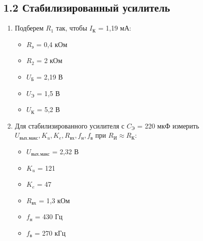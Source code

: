 \documentclass[a4paper,12pt]{report}
\begin{document}
\subsection*{1.2 Стабилизированный усилитель}
\begin{enumerate}
    \item Подберем $R_{1}$ так, чтобы $I_{\text{К}}$ = 1,19 мА:
    \begin{itemize}
        \item $R_{\text{э}}$ = 0,4 кОм
        \item $R_{2}$ = 2 кОм
        \item $U_{\text{Б}}$ = 2,19 В
        \item $U_{\text{Э}}$ = 1,5 В
        \item $U_{\text{К}}$ = 5,2 В
    \end{itemize}
    \item Для стабилизированного усилителя с $C_{\text{Э}}$ = 220 мкФ измерить $U_{\text{вых.макс}}, K_{u}, K_{e}, R_{\text{вх}}, f_{\text{н}}, f_{\text{в}}$ при $R_{\text{И}} \approx R_{\text{К}}$:
    \begin{itemize}
        \item $U_{\text{вых.макс}}$ = 2,32 В
        \item $K_{u}$ = 121
        \item $K_{e}$ = 47
        \item $R_{\text{вх}}$ = 1,3 кОм
        \item $f_{\text{н}}$ = 430 Гц
        \item $f_{\text{в}}$ = 270 кГц
    \end{itemize}

    
\end{enumerate}
\end{document}
